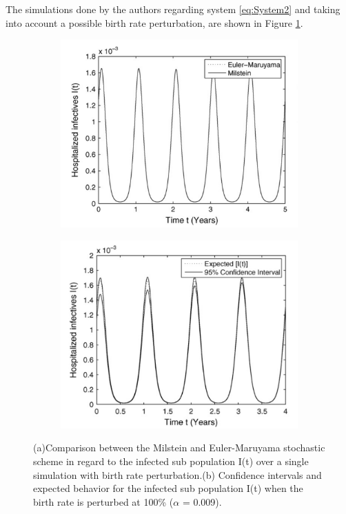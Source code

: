 The simulations done by the authors regarding system \ref{eq:System2} and taking into account a possible birth rate perturbation, are shown in Figure \ref{birth1}.  
\begin{figure}[h!]
    \begin{subfigure}{0.5\textwidth}
        \includegraphics[width=\linewidth]{IMG/Euler_Maruyama_birth.png}
        \caption{}
    \end{subfigure}
    \begin{subfigure}{0.5\textwidth}
        \includegraphics[width=\linewidth]{IMG/birth_rate_is_perturbated1.png}
        \caption{}
    \end{subfigure}
    \caption{(a)Comparison between the Milstein and Euler-Maruyama stochastic scheme in regard to the infected sub population I(t) over a single simulation with birth rate perturbation.(b) Confidence intervals and expected behavior for the infected sub population I(t) when the birth rate is perturbed at 100\% ($\alpha$ = 0.009).}
    \label{birth1}
\end{figure}

